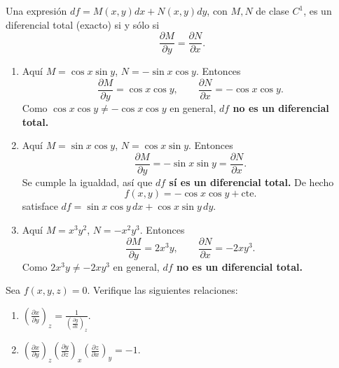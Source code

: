 \documentclass[12pt,a4paper]{article}
\newcommand{\pd}[3]{\left(\frac{\partial #1}{\partial #2}\right)_{#3}}
\begin{document}
    \begin{solucion}
        Una expresión $df=M(x,y)dx+N(x,y)dy$, con $M,N$ de clase $C^{1}$, es un diferencial
        total (exacto) si y sólo si
        \begin{equation*}
            \frac{\partial M}{\partial y}=\frac{\partial N}{\partial x}.
        \end{equation*}
        \begin{enumerate}
            \item[(1)] Aquí $M=\cos x\sin y$, $N=-\sin x\cos y$. Entonces
            \begin{equation*}
                \frac{\partial M}{\partial y}=\cos x\cos y, \qquad \frac{\partial N}{\partial x}=-\cos x\cos y.
            \end{equation*}
            Como $\cos x\cos y\neq-\cos x\cos y$ en general, \textbf{$df$ no es un diferencial total.}
            \item[(2)] Aquí $M=\sin x\cos y$, $N=\cos x\sin y$. Entonces
            \begin{equation*}
                \frac{\partial M}{\partial y}=-\sin x\sin y=\frac{\partial N}{\partial x}.
            \end{equation*}
            Se cumple la igualdad, así que \textbf{$df$ sí es un diferencial total.} De hecho
            \begin{equation*}
                f(x,y)=-\cos x\cos y+\text{cte.}
            \end{equation*}
            satisface $df=\sin x\cos y\,dx+\cos x\sin y\,dy$.
            \item[(3)] Aquí $M=x^{3}y^{2}$, $N=-x^{2}y^{3}$. Entonces
            \begin{equation*}
                \frac{\partial M}{\partial y}=2x^{3}y, \qquad \frac{\partial N}{\partial x}=-2xy^{3}.
            \end{equation*}
            Como $2x^{3}y\neq-2xy^{3}$ en general, \textbf{$df$ no es un diferencial total.}
        \end{enumerate}
    \end{solucion}

    \begin{problema}
        Sea $f(x,y,z)=0$. Verifique las siguientes relaciones:
        \begin{enumerate}
            \item[(1)] $\displaystyle\pd{x}{y}{z}=\frac{1}{\pd{y}{x}{z}}$.
            \item[(2)] $\displaystyle\pd{x}{y}{z}\pd{y}{z}{x}\pd{z}{x}{y}=-1$.
        \end{enumerate}
    \end{problema}
\end{document}
